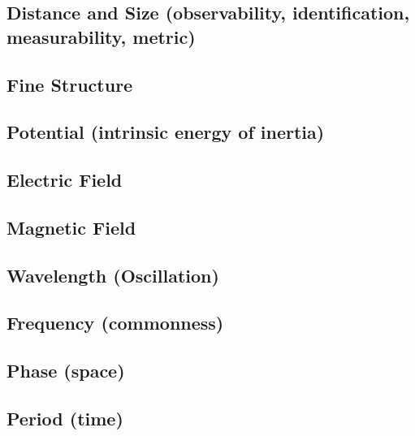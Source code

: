 \subsection{Distance and Size (observability, identification, measurability, metric)} 
 \newline \newline
\vspace{5ex}
\subsection{Fine Structure}

\vspace{5ex}
\subsection{Potential (intrinsic energy of inertia)}

\vspace{5ex}
\subsection{Electric Field}

\vspace{5ex}
\subsection{Magnetic Field}

\subsection{Wavelength (Oscillation)}

\vspace{5ex}
\subsection{Frequency (commonness)}

\vspace{5ex}
\subsection{Phase (space)}


\vspace{5ex}
\subsection{Period (time)}

\vspace{5ex}
